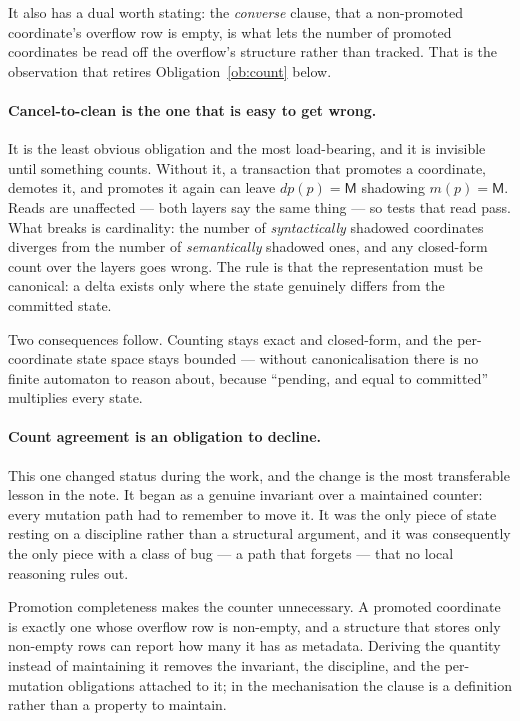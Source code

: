 \documentclass[11pt,a4paper]{article}
\theoremstyle{plain}
\theoremstyle{definition}
\theoremstyle{remark}
\newcommand{\M}{\mathsf{M}}
\begin{document}
It also has a dual worth stating: the \emph{converse} clause, that a
non-promoted coordinate's overflow row is empty, is what lets the number of
promoted coordinates be read off the overflow's structure rather than tracked.
That is the observation that retires Obligation~\ref{ob:count} below.

\paragraph{Cancel-to-clean is the one that is easy to get wrong.}
It is the least obvious obligation and the most load-bearing, and it is
invisible until something counts. Without it, a transaction that promotes a
coordinate, demotes it, and promotes it again can leave $dp(p) = \M$ shadowing
$m(p) = \M$. Reads are unaffected --- both layers say the same thing --- so
tests that read pass. What breaks is cardinality: the number of
\emph{syntactically} shadowed coordinates diverges from the number of
\emph{semantically} shadowed ones, and any closed-form count over the layers
goes wrong. The rule is that the representation must be canonical: a delta
exists only where the state genuinely differs from the committed state.

Two consequences follow. Counting stays exact and closed-form, and the
per-coordinate state space stays bounded --- without canonicalisation there is
no finite automaton to reason about, because ``pending, and equal to
committed'' multiplies every state.

\paragraph{Count agreement is an obligation to decline.}
This one changed status during the work, and the change is the most
transferable lesson in the note. It began as a genuine invariant over a
maintained counter: every mutation path had to remember to move it. It was the
only piece of state resting on a discipline rather than a structural argument,
and it was consequently the only piece with a class of bug --- a path that
forgets --- that no local reasoning rules out.

Promotion completeness makes the counter unnecessary. A promoted coordinate is
exactly one whose overflow row is non-empty, and a structure that stores only
non-empty rows can report how many it has as metadata. Deriving the quantity
instead of maintaining it removes the invariant, the discipline, and the
per-mutation obligations attached to it; in the mechanisation the clause is a
definition rather than a property to maintain.
\end{document}
